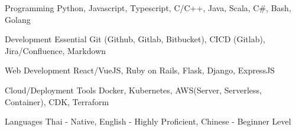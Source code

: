 

\begin{cvskills}

  \cvskill
    {Programming} %
    {Python, Javascript, Typescript, C/C++, Java, Scala, C\#, Bash, Golang} %

\cvskill
    {Development Essential} %
    {Git (Github, Gitlab, Bitbucket), CICD (Gitlab), Jira/Confluence, Markdown} %

  \cvskill
    {Web Development} %
    {React/VueJS, Ruby on Rails, Flask, Django, ExpressJS} %


  \cvskill
    {Cloud/Deployment Tools} %
    {Docker, Kubernetes, AWS(Server, Serverless, Container), CDK, Terraform} %

  \cvskill
    {Languages} %
    {Thai - Native, English - Highly Proficient, Chinese - Beginner Level} %

\end{cvskills}
